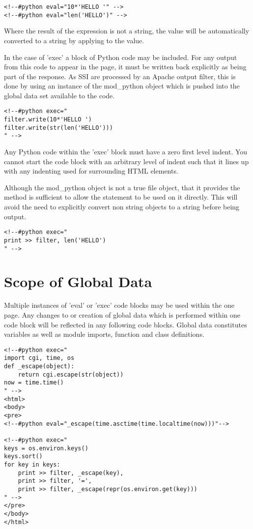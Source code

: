 \begin{verbatim}
<!--#python eval="10*'HELLO '" -->
<!--#python eval="len('HELLO')" -->
\end{verbatim}

Where the result of the expression is not a string, the value will be
automatically converted to a string by applying  to the value.

In the case of 'exec' a block of Python code may be included. For any
output from this code to appear in the page, it must be written back
explicitly as being part of the response. As SSI are processed by an Apache
output filter, this is done by using an instance of the mod_python
 object which is pushed into the global data set available to
the code.

\begin{verbatim}
<!--#python exec="
filter.write(10*'HELLO ')
filter.write(str(len('HELLO')))
" -->
\end{verbatim}

Any Python code within the 'exec' block must have a zero first level
indent. You cannot start the code block with an arbitrary level of indent
such that it lines up with any indenting used for surrounding HTML
elements.

Although the mod_python  object is not a true file object, that
it provides the  method is sufficient to allow the 
statement to be used on it directly. This will avoid the need to explicitly
convert non string objects to a string before being output.

\begin{verbatim}
<!--#python exec="
print >> filter, len('HELLO')
" -->
\end{verbatim}

\section{Scope of Global Data\label{ssi-data-scope}}

Multiple instances of 'eval' or 'exec' code blocks may be used within the
one page. Any changes to or creation of global data which is performed
within one code block will be reflected in any following code blocks.
Global data constitutes variables as well as module imports, function and
class definitions.

\begin{verbatim}
<!--#python exec="
import cgi, time, os
def _escape(object):
    return cgi.escape(str(object))
now = time.time() 
" -->
<html>
<body>
<pre>
<!--#python eval="_escape(time.asctime(time.localtime(now)))"-->

<!--#python exec="
keys = os.environ.keys()
keys.sort()
for key in keys:
    print >> filter, _escape(key),
    print >> filter, '=',
    print >> filter, _escape(repr(os.environ.get(key)))
" -->
</pre>
</body>
</html>
\end{verbatim}

